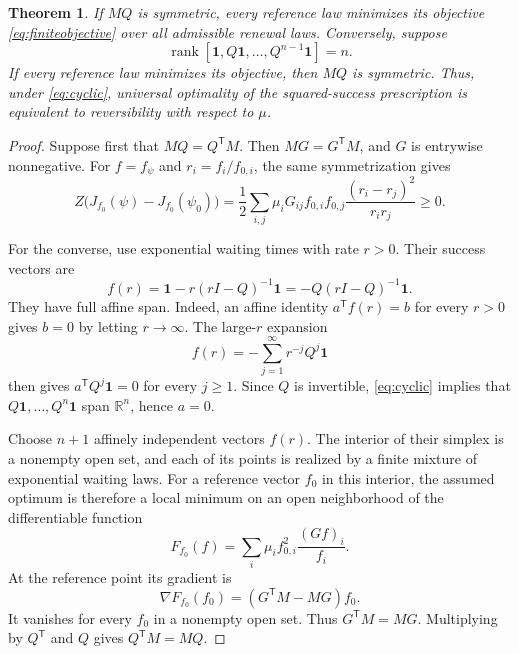 \documentclass[11pt]{amsart}
\newtheorem{theorem}{Theorem}[section]
\theoremstyle{definition}
\theoremstyle{remark}
\newcommand{\R}{\mathbb R}
\newcommand{\one}{\mathbf 1}
\begin{document}
\begin{theorem}\label{thm:finite}
If $MQ$ is symmetric, every reference law minimizes its objective \eqref{eq:finiteobjective} over all admissible renewal laws. Conversely, suppose
\begin{equation}\label{eq:cyclic}
 \operatorname{rank}[\one,Q\one,\ldots,Q^{n-1}\one]=n.
\end{equation}
If every reference law minimizes its objective, then $MQ$ is symmetric. Thus, under \eqref{eq:cyclic}, universal optimality of the squared-success prescription is equivalent to reversibility with respect to $\mu$.
\end{theorem}

\begin{proof}
Suppose first that $MQ=Q^{\mathsf T}M$. Then $MG=G^{\mathsf T}M$, and $G$ is entrywise nonnegative. For $f=f_\psi$ and $r_i=f_i/f_{0,i}$, the same symmetrization gives
\begin{equation}\label{eq:finitegap}
 Z\bigl(J_{f_0}(\psi)-J_{f_0}(\psi_0)\bigr)
 =\frac12\sum_{i,j}\mu_iG_{ij}f_{0,i}f_{0,j}
 \frac{(r_i-r_j)^2}{r_ir_j}\ge0.
\end{equation}

For the converse, use exponential waiting times with rate $r>0$. Their success vectors are
\begin{equation}\label{eq:resolvent}
 f(r)=\one-r(rI-Q)^{-1}\one=-Q(rI-Q)^{-1}\one.
\end{equation}
They have full affine span. Indeed, an affine identity $a^{\mathsf T}f(r)=b$ for every $r>0$ gives $b=0$ by letting $r\to\infty$. The large-$r$ expansion
\[
 f(r)=-\sum_{j=1}^\infty r^{-j}Q^j\one
\]
then gives $a^{\mathsf T}Q^j\one=0$ for every $j\ge1$. Since $Q$ is invertible, \eqref{eq:cyclic} implies that $Q\one,\ldots,Q^n\one$ span $\R^n$, hence $a=0$.

Choose $n+1$ affinely independent vectors $f(r)$. The interior of their simplex is a nonempty open set, and each of its points is realized by a finite mixture of exponential waiting laws. For a reference vector $f_0$ in this interior, the assumed optimum is therefore a local minimum on an open neighborhood of the differentiable function
\[
 F_{f_0}(f)=\sum_i\mu_i f_{0,i}^2\frac{(Gf)_i}{f_i}.
\]
At the reference point its gradient is
\[
 \nabla F_{f_0}(f_0)=(G^{\mathsf T}M-MG)f_0.
\]
It vanishes for every $f_0$ in a nonempty open set. Thus $G^{\mathsf T}M=MG$. Multiplying by $Q^{\mathsf T}$ and $Q$ gives $Q^{\mathsf T}M=MQ$.
\end{proof}
\end{document}
